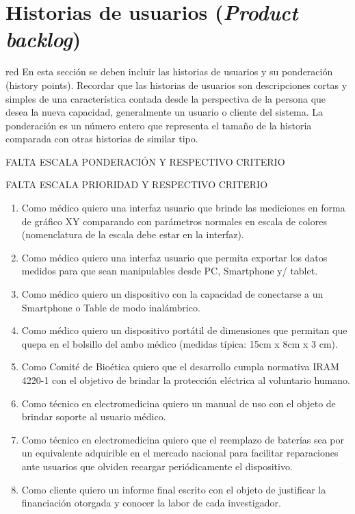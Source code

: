\documentclass[11pt]{charter}
\begin{document}
\pagebreak

\section{Historias de usuarios (\textit{Product backlog})}
\label{sec:backlog}

\begin{consigna}{red}
En esta sección se deben incluir las historias de usuarios y su ponderación (history points). Recordar que las historias de usuarios son descripciones cortas y simples de una característica contada desde la perspectiva de la persona que desea la nueva capacidad, generalmente un usuario o cliente del sistema. La ponderación es un número entero que representa el tamaño de la historia comparada con otras historias de similar tipo.
\end{consigna}


FALTA ESCALA PONDERACIÓN Y RESPECTIVO CRITERIO

FALTA ESCALA PRIORIDAD Y RESPECTIVO CRITERIO

\begin{enumerate}

\item Como médico quiero una interfaz usuario que brinde las mediciones en forma de  gráfico XY comparando con parámetros normales en escala de colores (nomenclatura de la escala debe estar en la interfaz).
\item Como médico quiero una interfaz usuario que permita exportar los datos medidos para que sean manipulables desde PC, Smartphone y/ tablet.
\item Como médico quiero  un dispositivo con la capacidad de conectarse a un Smartphone o Table de modo inalámbrico.
\item Como médico quiero un dispositivo portátil de dimensiones que permitan que quepa en el bolsillo del ambo médico (medidas típica: 15cm x 8cm x 3 cm).
\item Como Comité de Bioética quiero que el desarrollo cumpla normativa IRAM 4220-1 con el objetivo de brindar la protección eléctrica al voluntario humano.
\item Como técnico en electromedicina quiero un manual de uso con el objeto de brindar soporte al usuario médico.
\item Como técnico en electromedicina quiero que el reemplazo de baterías sea por un equivalente adquirible en el mercado nacional para facilitar reparaciones ante usuarios que olviden recargar periódicamente el dispositivo.
\item Como cliente quiero un informe final escrito con el objeto de justificar la financiación otorgada y conocer la labor de cada investigador.



\end{enumerate}
\end{document}
